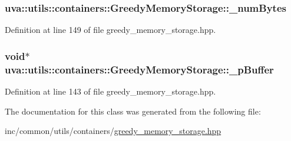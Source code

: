 \subsubsection[{\+\_\+num\+Bytes}]{ uva\+::utils\+::containers\+::\+Greedy\+Memory\+Storage\+::\+\_\+num\+Bytes\hspace{0.3cm}{\ttfamily [protected]}}\label{classuva_1_1utils_1_1containers_1_1_greedy_memory_storage_a235c1f54d73f7c62eeaf06d7b0709812}


Definition at line 149 of file greedy\+\_\+memory\+\_\+storage.\+hpp.

\hypertarget{classuva_1_1utils_1_1containers_1_1_greedy_memory_storage_ae42e0aec39c716fabdd42e0b6a623c75}{}
\subsubsection[{\+\_\+p\+Buffer}]{\setlength{\rightskip}{0pt plus 5cm}void$\ast$ uva\+::utils\+::containers\+::\+Greedy\+Memory\+Storage\+::\+\_\+p\+Buffer\hspace{0.3cm}{\ttfamily [protected]}}\label{classuva_1_1utils_1_1containers_1_1_greedy_memory_storage_ae42e0aec39c716fabdd42e0b6a623c75}


Definition at line 143 of file greedy\+\_\+memory\+\_\+storage.\+hpp.



The documentation for this class was generated from the following file\+:\begin{DoxyCompactItemize}
\item 
inc/common/utils/containers/\hyperlink{greedy__memory__storage_8hpp}{greedy\+\_\+memory\+\_\+storage.\+hpp}\end{DoxyCompactItemize}
